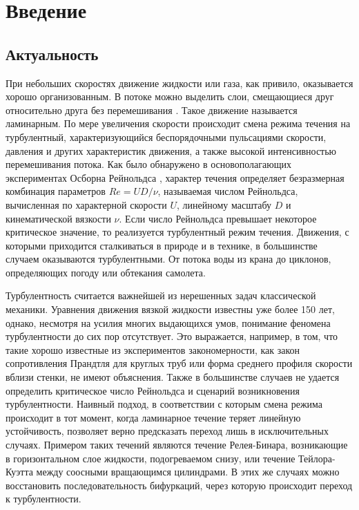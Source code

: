 \chapter{Введение}

\section{Актуальность} 

При небольших скоростях движение жидкости или газа, как привило, оказывается хорошо организованным. В потоке можно выделить слои, смещающиеся друг относительно друга без перемешивания \cite{Hof2010}. Такое движение называется ламинарным. По мере увеличения скорости происходит смена режима течения на турбулентный, характеризующийся беспорядочными пульсациями скорости, давления и других характеристик движения, а также высокой интенсивностью перемешивания потока. Как было обнаружено в основополагающих экспериментах Осборна Рейнольдса \cite{Reynolds1883}, характер течения определяет безразмерная комбинация параметров $Re = UD/\nu$, называемая числом Рейнольдса, вычисленная по характерной скорости $U$, линейному масштабу $D$ и кинематической вязкости $\nu$. Если число Рейнольдса превышает некоторое критическое значение, то реализуется турбулентный режим течения. Движения, с которыми приходится сталкиваться в природе и в технике, в большинстве случаем оказываются турбулентными. От потока воды из крана до циклонов, определяющих погоду или обтекания самолета. 


Турбулентность считается важнейшей из нерешенных задач классической механики. Уравнения движения вязкой жидкости известны уже более 150 лет, однако, несмотря на усилия многих выдающихся умов, понимание феномена турбулентности до сих пор отсутствует. Это выражается, например, в том, что такие хорошо известные из экспериментов закономерности, как закон сопротивления Прандтля для круглых труб или форма среднего профиля скорости вблизи стенки, не имеют объяснения. Также в большинстве случаев не удается определить критическое число Рейнольдса и сценарий возникновения турбулентности. Наивный подход, в соответствии с которым смена режима происходит в тот момент, когда ламинарное течение теряет линейную устойчивость, позволяет верно предсказать переход лишь в исключительных случаях. Примером таких течений являются течение Релея-Бинара, возникающие в горизонтальном слое жидкости, подогреваемом снизу, или течение Тейлора-Куэтта между соосными вращающимся цилиндрами. В этих же случаях можно восстановить последовательность бифуркаций, через которую происходит переход к турбулентности. 


